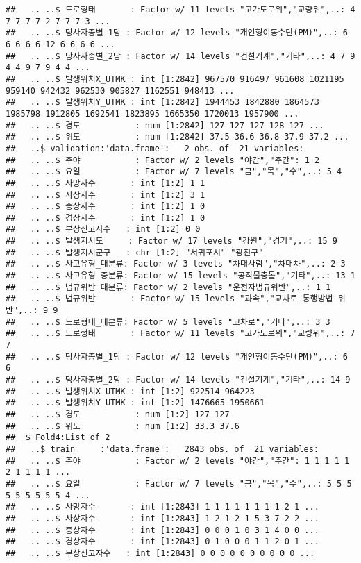 \documentclass[]{article}
\begin{document}
\begin{verbatim}
##   .. ..$ 도로형태       : Factor w/ 11 levels "고가도로위","교량위",..: 4 7 7 7 7 2 7 7 7 3 ...
##   .. ..$ 당사자종별_1당 : Factor w/ 12 levels "개인형이동수단(PM)",..: 6 6 6 6 6 12 6 6 6 6 ...
##   .. ..$ 당사자종별_2당 : Factor w/ 14 levels "건설기계","기타",..: 4 7 9 4 4 9 7 9 4 4 ...
##   .. ..$ 발생위치X_UTMK : int [1:2842] 967570 916497 961608 1021195 959140 942432 962530 905827 1162551 948413 ...
##   .. ..$ 발생위치Y_UTMK : int [1:2842] 1944453 1842880 1864573 1985798 1912805 1692541 1823895 1665350 1720013 1957900 ...
##   .. ..$ 경도           : num [1:2842] 127 127 127 128 127 ...
##   .. ..$ 위도           : num [1:2842] 37.5 36.6 36.8 37.9 37.2 ...
##   ..$ validation:'data.frame':   2 obs. of  21 variables:
##   .. ..$ 주야           : Factor w/ 2 levels "야간","주간": 1 2
##   .. ..$ 요일           : Factor w/ 7 levels "금","목","수",..: 5 4
##   .. ..$ 사망자수       : int [1:2] 1 1
##   .. ..$ 사상자수       : int [1:2] 3 1
##   .. ..$ 중상자수       : int [1:2] 1 0
##   .. ..$ 경상자수       : int [1:2] 1 0
##   .. ..$ 부상신고자수   : int [1:2] 0 0
##   .. ..$ 발생지시도     : Factor w/ 17 levels "강원","경기",..: 15 9
##   .. ..$ 발생지시군구   : chr [1:2] "서귀포시" "광진구"
##   .. ..$ 사고유형_대분류: Factor w/ 3 levels "차대사람","차대차",..: 2 3
##   .. ..$ 사고유형_중분류: Factor w/ 15 levels "공작물충돌","기타",..: 13 1
##   .. ..$ 법규위반_대분류: Factor w/ 2 levels "운전자법규위반",..: 1 1
##   .. ..$ 법규위반       : Factor w/ 15 levels "과속","교차로 통행방법 위반",..: 9 9
##   .. ..$ 도로형태_대분류: Factor w/ 5 levels "교차로","기타",..: 3 3
##   .. ..$ 도로형태       : Factor w/ 11 levels "고가도로위","교량위",..: 7 7
##   .. ..$ 당사자종별_1당 : Factor w/ 12 levels "개인형이동수단(PM)",..: 6 6
##   .. ..$ 당사자종별_2당 : Factor w/ 14 levels "건설기계","기타",..: 14 9
##   .. ..$ 발생위치X_UTMK : int [1:2] 922514 964223
##   .. ..$ 발생위치Y_UTMK : int [1:2] 1476665 1950661
##   .. ..$ 경도           : num [1:2] 127 127
##   .. ..$ 위도           : num [1:2] 33.3 37.6
##  $ Fold4:List of 2
##   ..$ train     :'data.frame':   2843 obs. of  21 variables:
##   .. ..$ 주야           : Factor w/ 2 levels "야간","주간": 1 1 1 1 1 2 1 1 1 1 ...
##   .. ..$ 요일           : Factor w/ 7 levels "금","목","수",..: 5 5 5 5 5 5 5 5 5 4 ...
##   .. ..$ 사망자수       : int [1:2843] 1 1 1 1 1 1 1 1 2 1 ...
##   .. ..$ 사상자수       : int [1:2843] 1 2 1 2 1 5 3 7 2 2 ...
##   .. ..$ 중상자수       : int [1:2843] 0 0 0 1 0 3 1 4 0 0 ...
##   .. ..$ 경상자수       : int [1:2843] 0 1 0 0 0 1 1 2 0 1 ...
##   .. ..$ 부상신고자수   : int [1:2843] 0 0 0 0 0 0 0 0 0 0 ...

\end{verbatim}
\end{document}
